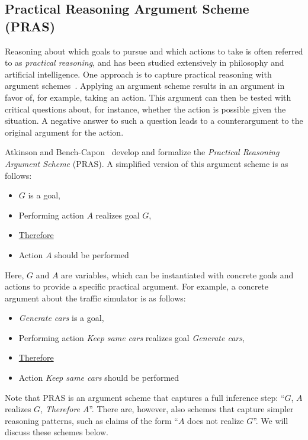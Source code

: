 \subsection{Practical Reasoning Argument Scheme (PRAS)}
\label{sect:background:pras}

Reasoning about which goals to pursue and which actions to take is often referred to as \emph{practical reasoning}, and has been studied extensively in philosophy and artificial intelligence. One approach is to capture practical reasoning with argument schemes~\cite{walton1990}. Applying an argument scheme results in an argument in favor of, for example, taking an action. This argument can then be tested with critical questions about, for instance, whether the action is possible given the situation. A negative answer to such a question leads to a counterargument to the original argument for the action. 

Atkinson and Bench-Capon~\cite{atkinson2007} develop and formalize the \emph{Practical Reasoning Argument Scheme} (PRAS). A simplified version of this argument scheme is as follows:

\begin{itemize}
\item[] $G$ is a goal,
\item[] Performing action $A$ realizes goal $G$,
\item[] \underline{Therefore} 
\item[] Action $A$ should be performed
\end{itemize}

Here, $G$ and $A$ are variables, which can be instantiated with concrete goals and actions to provide a specific practical argument. For example, a concrete argument about the traffic simulator is as follows: 
\begin{itemize}
\item[] \emph{Generate cars} is a goal,
\item[] Performing action \emph{Keep same cars} realizes goal \emph{Generate cars}, 
\item[] \underline{Therefore} 
\item[] Action \emph{Keep same cars} should be performed
\end{itemize}

Note that PRAS is an argument scheme that captures a full inference step: ``$G$, $A$ realizes $G$, \emph{Therefore} $A$''. There are, however, also schemes that capture simpler reasoning patterns, such as claims of the form ``$A$ does not realize $G$''. We will discuss these schemes below. 

